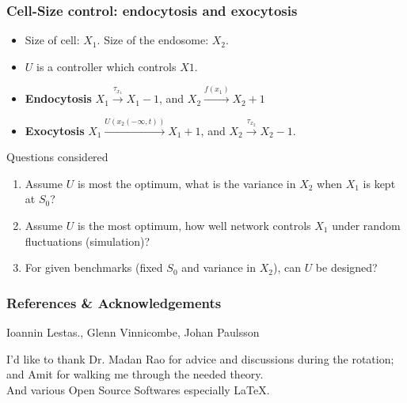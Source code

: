 \documentclass{beamer}
\begin{document}
\begin{frame}
    \frametitle{Cell-Size control: endocytosis and exocytosis}

    \begin{block}{}
        \begin{itemize}
            \item Size of cell: $X_1$. Size of the endosome: $X_2$.
            \item $U$ is a controller which controls $X1$. 
        \end{itemize}
    \end{block}

    \begin{itemize}
        \item \textbf{Endocytosis} $X_1 \xrightarrow{\tau_{x_1}} X_1 -1$, and $X_2
            \xrightarrow{f(x_1)} X_2 + 1$
        \item \textbf{Exocytosis} $X_1 \xrightarrow{U(x_2(-\infty,t))} X_1 +
            1$, and $X_2 \xrightarrow{\tau_{x_2}} X_2 - 1$.

    \end{itemize}


    \begin{block}{Questions considered}
        \begin{enumerate}
            \item Assume $U$ is most the optimum, what is the variance in
                $X_2$ when $X_1$ is kept at $S_0$?
            \item Assume $U$ is the most optimum, how well network
                controls $X_1$ under random fluctuations (simulation)?
            \item For given benchmarks (fixed $S_0$ and variance in
                $X_2$), can $U$ be designed?
        \end{enumerate}
    \end{block}

\end{frame}

\begin{frame}
    \frametitle{References \& Acknowledgements}

    \begin{thebibliography}{10}
            Ioannin Lestas., Glenn Vinnicombe, Johan Paulsson
    \end{thebibliography}

    \begin{block}{}
        
        I'd like to thank Dr. Madan Rao for advice and discussions during the
        rotation; and Amit for walking me through the needed theory. 
        \\
        And various Open Source Softwares especially \LaTeX.

    \end{block}

\end{frame}
\end{document}
